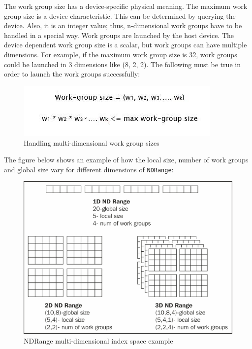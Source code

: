 The work group size has a device-specific physical meaning. The maximum work group size is a device characteristic. This can be determined by querying the device. Also, it is an integer value; thus, n-dimensional work groups have to be handled in a special way. Work groups are launched by the host device. \newline\newline
The device dependent work group size is a scalar, but work groups can have multiple dimensions. For example, if the maximum work group size is 32, work groups could be launched in 3 dimensions like (8, 2, 2). The following must be true in order to launch the work groups successfully: 
\begin{figure}[h!]
\includegraphics[width=\linewidth]{figures/Work-Group_Size.JPG}
\caption{Handling multi-dimensional work group sizes}
\label{fig:opencl4}
\end{figure} 

The figure below shows an example of how the local size, number of work groups and global size vary for different dimensions of \verb|NDRange|:
\begin{figure}[h!]
\includegraphics[width=\linewidth]{figures/NDRange_Kernel_Example.jpg}
\caption{NDRange multi-dimensional index space example}
\label{fig:opencl5}
\end{figure}

